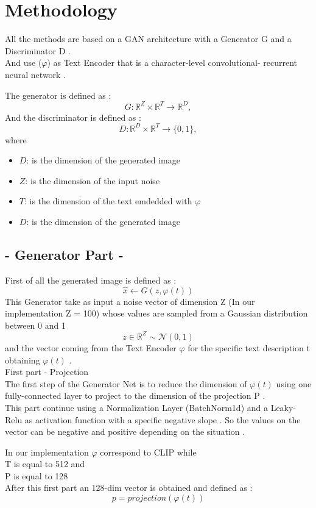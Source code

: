\section*{ Methodology }
All the methods are based on a GAN architecture with a Generator G 
and a Discriminator D . \\ 
And use ($\varphi$) as Text Encoder that is a character-level convolutional-
recurrent neural network .

The generator is defined as :
\[
G : \mathbb{R}^Z \times \mathbb{R}^{T} \rightarrow \mathbb{R}^D,
\]
And the discriminator is defined as :  
\[
D : \mathbb{R}^D \times \mathbb{R}^{T} \rightarrow \{0, 1\},
\]
where 
\begin{itemize}
    \item ${D}$: is the dimension of the generated image
    \item ${Z}$: is the dimension of the input noise 
    \item ${T}$: is the dimension of the text emdedded with $\varphi$
    \item ${D}$: is the dimension of the generated image
\end{itemize}

\subsection*{- Generator Part -}
First of all the generated image is defined as :
\[
\hat{x} \leftarrow G(z, \varphi(t))
\]
This Generator take as input a noise vector of dimension Z 
(In our implementation Z = 100) whose values are sampled from a Gaussian 
distribution between 0 and 1
\\
\[
z \in \mathbb{R}^Z \sim \mathcal{N}(0, 1)
\]
and the vector coming from the Text Encoder $\varphi$ for the specific 
text description t obtaining $\varphi(t)$ .
\\
First part - Projection \\
The first step of the Generator Net is to reduce the dimension of 
$\varphi(t)$ using one fully-connected layer to project 
to the dimension of the projection P . \\
This part continue using a Normalization Layer (BatchNorm1d)
and a Leaky-Relu as activation function with a specific negative slope .  
So the values on the vector can be negative and positive depending on the 
situation .

In our implementation $\varphi$ correspond to CLIP while \\
T is equal to 512 and \\
P is equal to 128 \\
After this first part an 128-dim vector is obtained and defined as :
\[
 p = projection( \varphi(t) )
\]


